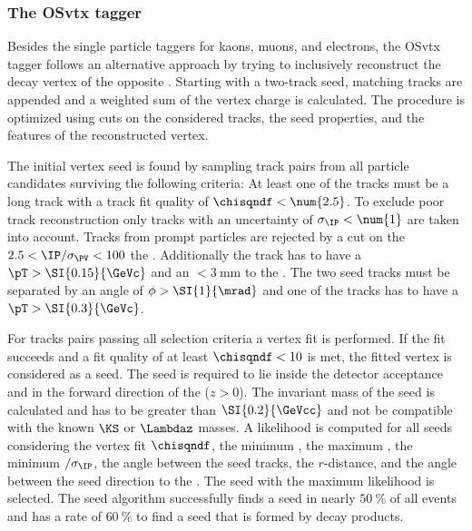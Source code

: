 \subsubsection{The \acl{OSvtx} tagger}
\label{sec:flavour_tagging:os:vertex}

Besides the single particle taggers for kaons, muons, and electrons, the
\ac{OSvtx} tagger follows an alternative approach by trying to inclusively
reconstruct the decay vertex of the opposite \bhadron. Starting with a two-track
seed, matching tracks are appended and a weighted sum of the vertex charge is
calculated. The procedure is optimized using cuts on the considered tracks, the
seed properties, and the features of the reconstructed vertex.

The initial vertex seed is found by sampling track pairs from all particle
candidates surviving the following criteria: At least one of the tracks must be
a long track with a track fit quality of $\chisqndf<\num{2.5}$. To exclude poor
track reconstruction only tracks with an \IP uncertainty of
$\sigma_\text{\IP}<\num{1}$ are taken into account. Tracks from prompt particles
are rejected by a cut on the $2.5<\text{\IP}/\sigma_\text{\PV}<100$ \wrt the
\PV. Additionally the track has to have a $\pT>\SI{0.15}{\GeVc}$ and an
\IP$<\SI{3}{\milli\metre}$ \wrt to the \PV. 
The two seed tracks must be separated by an angle of $\phi>\SI{1}{\mrad}$ and
one of the tracks has to have a $\pT>\SI{0.3}{\GeVc}$.

For tracks pairs passing all selection criteria a vertex fit is performed. If
the fit succeeds and a fit quality of at least $\chisqndf<10$ is met, the fitted
vertex is considered as a seed. The seed is required to lie inside the detector
acceptance and in the forward direction of the \PV ($z>0$).  
The invariant mass of the seed is calculated and has to be greater than
$\SI{0.2}{\GeVcc}$ and not be compatible with the known $\KS$ or $\Lambdaz$
masses. %
A likelihood is computed for all seeds considering the vertex fit $\chisqndf$,
the minimum \pT, the maximum \PV \IP, the minimum \PV \IP$/\sigma_\text{\IP}$,
the angle between the seed tracks, the $r$-distance, and the angle between the
seed direction \wrt to the \PV. The seed with the maximum likelihood is
selected. The seed algorithm successfully finds a seed in nearly
$\SI{50}{\percent}$ of all events and has a rate of $\SI{60}{\percent}$ to find
a seed that is formed by \bhadron decay products.

